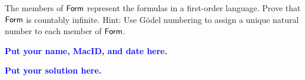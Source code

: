 \documentclass[11pt,fleqn]{article}
\newcommand{\mname}[1]{\mbox{\sf #1}}
\begin{document}
%
The members of $\mname{Form}$ represent the formulas in a first-order
language.  Prove that $\mname{Form}$ is countably infinite.  Hint: Use
G\"odel numbering to assign a unique natural number to each member of
$\mname{Form}$.


\bigskip

\noindent
\textcolor{blue}{\textbf{Put your name, MacID, and date here.}}

\bigskip

\noindent
\textcolor{blue}{\textbf{Put your solution here.}}
\end{document}
